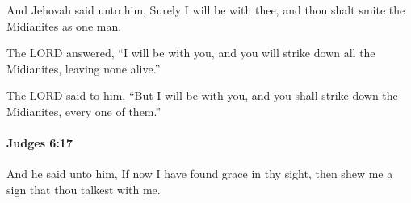 			\begin{versebox}
					\item[BHS] 
					\item[ASV] And Jehovah said unto him, Surely I will be with thee, and thou shalt smite the Midianites as one man.
					\item[NIV] The LORD answered, “I will be with you, and you will strike down all the Midianites, leaving none alive.”
					\item[NRSV] The LORD said to him, “But I will be with you, and you shall strike down the Midianites, every one of them.”
			\end{versebox}

		\paragraph{Judges 6:17} %
			\label{JUDGES-6-17}

			And he said unto him, If now I have found grace in thy sight, then shew me a sign that thou talkest with me.

